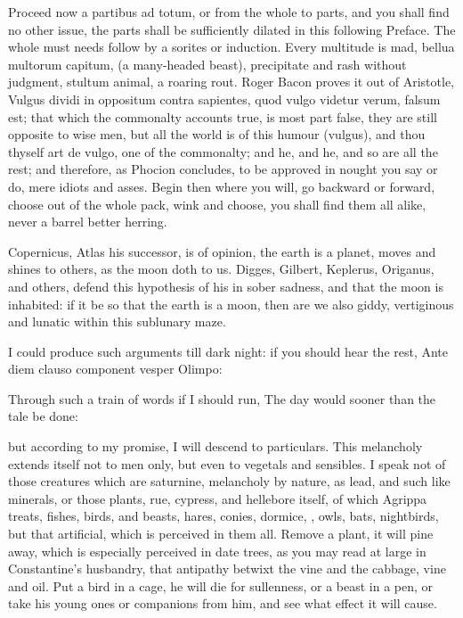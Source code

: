 {Proceed now a partibus ad totum, or from the whole to parts, and you
shall find no other issue, the parts shall be sufficiently dilated in
this following Preface. The whole must needs follow by a sorites or
induction. Every multitude is mad, bellua multorum capitum, (a
many-headed beast), precipitate and rash without judgment, stultum
animal, a roaring rout. Roger Bacon proves it out of Aristotle,
Vulgus dividi in oppositum contra sapientes, quod vulgo videtur verum,
falsum est; that which the commonalty accounts true, is most part
false, they are still opposite to wise men, but all the world is of
this humour (vulgus), and thou thyself art de vulgo, one of the
commonalty; and he, and he, and so are all the rest; and therefore, as
Phocion concludes, to be approved in nought you say or do, mere idiots
and asses. Begin then where you will, go backward or forward, choose
out of the whole pack, wink and choose, you shall find them all alike,
never a barrel better herring.

Copernicus, Atlas his successor, is of opinion, the earth is a planet,
moves and shines to others, as the moon doth to us. Digges, Gilbert,
Keplerus, Origanus, and others, defend this hypothesis of his in sober
sadness, and that the moon is inhabited: if it be so that the earth is
a moon, then are we also giddy, vertiginous and lunatic within this
sublunary maze.

I could produce such arguments till dark night: if you should hear the
rest,
Ante diem clauso component vesper Olimpo:

Through such a train of words if I should run,
The day would sooner than the tale be done:

but according to my promise, I will descend to particulars. This
melancholy extends itself not to men only, but even to vegetals and
sensibles. I speak not of those creatures which are saturnine,
melancholy by nature, as lead, and such like minerals, or those plants,
rue, cypress, \etc{} and hellebore itself, of which Agrippa treats,
fishes, birds, and beasts, hares, conies, dormice, \etc{}, owls, bats,
nightbirds, but that artificial, which is perceived in them all. Remove
a plant, it will pine away, which is especially perceived in date
trees, as you may read at large in Constantine's husbandry, that
antipathy betwixt the vine and the cabbage, vine and oil. Put a bird in
a cage, he will die for sullenness, or a beast in a pen, or take his
young ones or companions from him, and see what effect it will cause.

}
